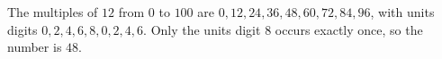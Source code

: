 The multiples of $12$ from $0$ to $100$ are $0,12,24,36,48,60,72,84,96$, with units digits $0,2,4,6,8,0,2,4,6$. Only the units digit $8$ occurs exactly once, so the number is $\boxed{48}$.
